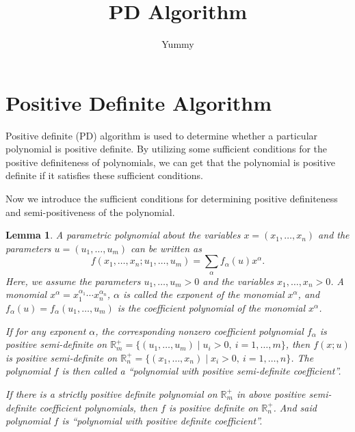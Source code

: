 \documentclass[10pt,a4paper]{article}
\newtheorem{Lemma}{Lemma}
\begin{document}
\title{PD Algorithm}
\author{Yummy}

\maketitle

\section{Positive Definite Algorithm}

Positive definite (PD) algorithm is used to determine whether a particular polynomial is positive definite. By utilizing some sufficient conditions for the positive definiteness of polynomials, we can get that the polynomial is positive definite if it satisfies these sufficient conditions.

Now we introduce the sufficient conditions for determining positive definiteness and semi-positiveness of the polynomial.

\begin{Lemma}\label{le:CoeffPD}
  A parametric polynomial about the variables $x = (x_1, \dots, x_n)$ and the parameters $u = (u_1, \dots, u_m)$ can be written as
  \begin{equation*}
    f(x_1, \dots, x_n; u_1, \dots, u_m) = \sum_{\alpha} f_{\alpha}(u) x^{\alpha}.
  \end{equation*}
  Here, we assume the parameters $u_1, \dots, u_m > 0$ and the variables $x_1, \dots, x_n > 0$. A monomial $x^{\alpha} = x_1^{\alpha_1} \cdots x_n^{\alpha_n}$, $\alpha$ is called the exponent of the monomial $x^\alpha$, and $f_{\alpha}(u) = f_{\alpha}(u_1, \dots, u_m)$ is the coefficient polynomial of the monomial $x^{\alpha}$.

  If for any exponent $\alpha$, the corresponding nonzero coefficient polynomial $f_{\alpha}$ is positive semi-definite on $\mathbb{R}_{m}^{+} = \{(u_1, \dots, u_m) \mid u_i > 0,\ i = 1, \dots, m\}$, then $f(x; u)$ is positive semi-definite on $\mathbb{R}_{n}^{+} = \{(x_1, \dots, x_n) \mid x_i > 0,\ i = 1, \dots, n\}$. The polynomial $f$ is then called a ``polynomial with positive semi-definite coefficient''.

  If there is a strictly positive definite polynomial on $\mathbb{R}_{m}^{+}$  in above positive semi-definite coefficient polynomials, then $f$ is positive definite on $\mathbb{R}_{n}^{+}$. And said polynomial $f$ is ``polynomial with positive definite coefficient''.
\end{Lemma}
\end{document}
